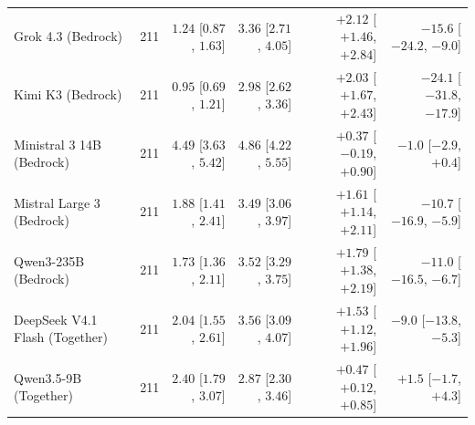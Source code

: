 \begin{tabular}{lrrrrr}
  Grok 4.3 (Bedrock) & 211 & $1.24$ [$0.87$, $1.63$] & $3.36$ [$2.71$, $4.05$] & $+2.12$ [$+1.46$, $+2.84$] & $-15.6$ [$-24.2$, $-9.0$] \\
  Kimi K3 (Bedrock) & 211 & $0.95$ [$0.69$, $1.21$] & $2.98$ [$2.62$, $3.36$] & $+2.03$ [$+1.67$, $+2.43$] & $-24.1$ [$-31.8$, $-17.9$] \\
  Ministral 3 14B (Bedrock) & 211 & $4.49$ [$3.63$, $5.42$] & $4.86$ [$4.22$, $5.55$] & $+0.37$ [$-0.19$, $+0.90$] & $-1.0$ [$-2.9$, $+0.4$] \\
  Mistral Large 3 (Bedrock) & 211 & $1.88$ [$1.41$, $2.41$] & $3.49$ [$3.06$, $3.97$] & $+1.61$ [$+1.14$, $+2.11$] & $-10.7$ [$-16.9$, $-5.9$] \\
  Qwen3-235B (Bedrock) & 211 & $1.73$ [$1.36$, $2.11$] & $3.52$ [$3.29$, $3.75$] & $+1.79$ [$+1.38$, $+2.19$] & $-11.0$ [$-16.5$, $-6.7$] \\
  DeepSeek V4.1 Flash (Together) & 211 & $2.04$ [$1.55$, $2.61$] & $3.56$ [$3.09$, $4.07$] & $+1.53$ [$+1.12$, $+1.96$] & $-9.0$ [$-13.8$, $-5.3$] \\
  Qwen3.5-9B (Together) & 211 & $2.40$ [$1.79$, $3.07$] & $2.87$ [$2.30$, $3.46$] & $+0.47$ [$+0.12$, $+0.85$] & $+1.5$ [$-1.7$, $+4.3$] \\
  \bottomrule
\end{tabular}
